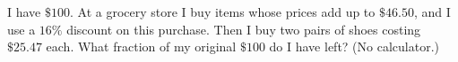 I have $\$100$. At a grocery store I buy items whose prices add up to $\$46.50$, and I use a $16\%$ discount on this purchase. Then I buy two pairs of shoes costing $\$25.47$ each. What fraction of my original $\$100$ do I have left? (No calculator.)
